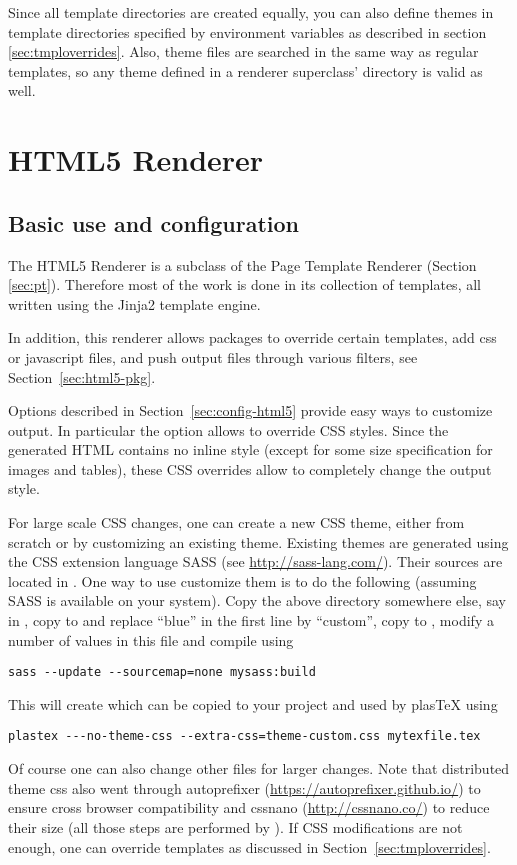 Since all template directories are created equally, you can also define
themes in template directories specified by environment variables as
described in section \ref{sec:tmploverrides}.  Also, theme files are
searched in the same way as regular templates, so any theme defined
in a renderer superclass' directory is valid as well.

\section{HTML5 Renderer}\label{sec:html5}

\subsection{Basic use and configuration}

The HTML5 Renderer is a subclass of the Page Template Renderer (Section
\ref{sec:pt}). Therefore most of the work is done in its collection of
templates, all written using the Jinja2 template engine. 

In addition, this renderer allows packages to override certain templates,
add css or javascript files, and push output files through various
filters, see Section~\ref{sec:html5-pkg}.

Options described in Section~\ref{sec:config-html5} provide easy ways to
customize output. In particular the  option
allows to override CSS styles. Since the generated HTML contains no
inline style (except for some size specification for images and tables),
these CSS overrides allow to completely change the output style.

For large scale CSS changes, one can create a new
CSS theme, either from scratch or by customizing an existing theme.
Existing themes are generated using the CSS extension language SASS (see
\url{http://sass-lang.com/}). Their sources are located in
. One way to use customize
them is to do the following (assuming SASS is available on your system).
Copy the above directory somewhere else, say in , copy
 to  and replace ``blue''
in the first line by ``custom'', copy  to
, modify a number of values in this file
and compile using
\begin{verbatim}
sass --update --sourcemap=none mysass:build
\end{verbatim}
This will create  which can be copied to
your project and used by plasTeX using
\begin{verbatim}
plastex ---no-theme-css --extra-css=theme-custom.css mytexfile.tex
\end{verbatim}
Of course one can also change other  files for larger
changes. Note that distributed theme css also went through autoprefixer
(\url{https://autoprefixer.github.io/}) to ensure cross browser
compatibility and cssnano (\url{http://cssnano.co/}) to reduce their
size (all those steps are performed by
). If CSS
modifications are not enough, one can override templates as discussed in
Section~\ref{sec:tmploverrides}.

